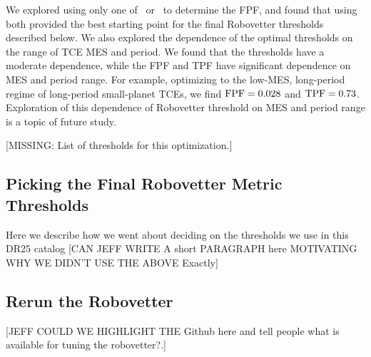 We explored using only one of \scrtce\ or \invtce\ to determine the FPF, and found that using both provided the best starting point for the final Robovetter thresholds described below.  We also explored the dependence of the optimal thresholds on the range of TCE MES and period.  We found that the thresholds have a moderate dependence, while the FPF and TPF have significant dependence on MES and period range.  For example, optimizing to the low-MES, long-period regime of long-period small-planet TCEs,  we find ${\rm FPF} = 0.028$ and ${\rm TPF} = 0.73$.  Exploration of this dependence of Robovetter threshold on MES and period range is a topic of future study.

[MISSING: List of thresholds for this optimization.]

\subsection{Picking the Final Robovetter Metric Thresholds}
Here we describe how we went about deciding on the thresholds we use in this DR25 catalog
[CAN JEFF WRITE A short PARAGRAPH here MOTIVATING WHY WE DIDN'T USE THE ABOVE Exactly]\\


\subsection{Rerun the Robovetter}

[JEFF COULD WE HIGHLIGHT THE Github here and tell people what is available for tuning the robovetter?.]